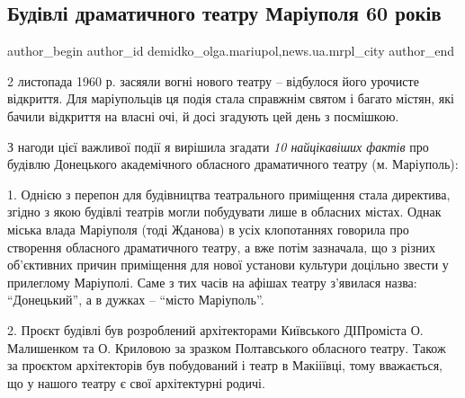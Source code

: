  
 
 
 
 
 
\subsection{Будівлі драматичного театру Маріуполя 60 років}
\label{sec:02_11_2020.stz.news.ua.mrpl_city.1.budivli_dramteatru_mrpl_60_rokiv}
 
\ifcmt
 author_begin
   author_id demidko_olga.mariupol,news.ua.mrpl_city
 author_end
\fi


2 листопада 1960 р. засяяли вогні нового театру – відбулося його урочисте
відкриття. Для маріупольців ця подія стала справжнім святом і багато містян,
які бачили відкриття на власні очі, й досі згадують цей день з посмішкою.

З нагоди цієї важливої події я вирішила згадати \emph{10 найцікавіших фактів} про
будівлю Донецького академічного обласного драматичного театру (м. Маріуполь):

1. Однією з перепон для будівництва театрального приміщення стала директива,
згідно з якою будівлі театрів могли побудувати лише в обласних містах. Однак
міська влада Маріуполя (тоді Жданова) в усіх клопотаннях говорила про створення
обласного драматичного театру, а вже потім зазначала, що з різних об'єктивних
причин приміщення для нової установи культури доцільно звести у прилеглому
Маріуполі. Саме з тих часів на афішах театру з'явилася назва: \enquote{Донецький}, а в
дужках – \enquote{місто Маріуполь}.


2. Проєкт будівлі був розроблений архітекторами Київського ДІПроміста О.
Малишенком та О. Криловою за зразком Полтавського обласного театру. Також за
проєктом архітекторів був побудований і театр в Макііївці, тому вважається, що
у нашого театру є свої архітектурні родичі.


